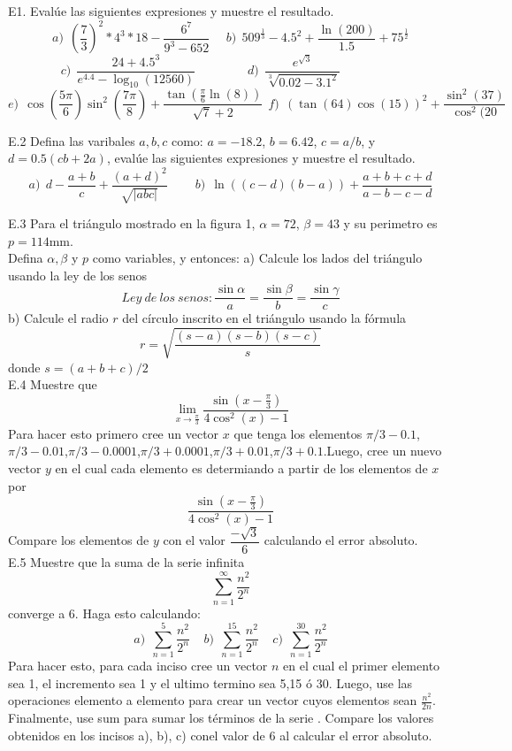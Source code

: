 \documentclass[12pt,letterpaper]{article}
\author{Andrés Limón Cruz }
\begin{document}
E1. Evalúe las siguientes expresiones y muestre el resultado.\\
$$
a)~~ \left( \frac{7}{3}\right) ^2 * 4^3 * 18 - \dfrac{6^7}{9^3-652}~~~~~~b)~~509^\frac{1}{3} -4.5^2+ \dfrac{\ln(200)}{1.5} +75^\frac{1}{2}
$$
$$
~~~~~~~c)~~\dfrac{24+4.5^3}{e^{4.4}-\log_{10}(12560)}~~~~~~~~~~~~~~~~~~~d)~~\dfrac{e^{\sqrt{3}}}{\sqrt[3]{0.02-3.1^2}}~~~~~~~~~~~~~~~~~~~~~~~~~~~~~
$$
$$
e)~~\cos \left( \frac{5 \pi}{6} \right) \sin^2 \left(\frac{7 \pi}{8} \right) + \dfrac{\tan \left( \frac{\pi}{6}\ln (8)\right)}{\sqrt{7} + 2}
~~f)~~\left( \tan(64) \cos(15) \right)^2 + \dfrac{\sin^2(37)}{\cos^2(20}
$$

E.2 Defina las varibales $a,b,c$ como: $a=-18.2$, $b=6.42$, $c=a/b$, y $d=0.5(cb+2a)$, evalúe las siguientes expresiones y muestre el resultado.
$$
a)~~d-\dfrac{a+b}{c}+\dfrac{(a+d)^2}{\sqrt{\vert abc \vert}}
~~~~~~~~~~b)~~\ln((c-d)(b-a))+ \dfrac{a+b+c+d}{a-b-c-d}
$$

E.3 Para el triángulo mostrado en la figura 1, $\alpha =72$, $\beta = 43$ y su perimetro es $p=114$mm.\\
Defina $\alpha , \beta$ y $p$ como variables, y entonces:
a) Calcule los lados del triángulo usando la ley de los senos
$$
Ley~de~los~senos: \dfrac{\sin \alpha}{a}= \dfrac{\sin \beta}{b}=\dfrac{\sin \gamma}{c}
$$
b) Calcule el radio $r$ del círculo inscrito en el triángulo usando la fórmula 
$$
r= \sqrt{\dfrac{(s-a)(s-b)(s-c)}{s}}
$$
donde $s = (a+b+c)/2$\\

E.4 Muestre que 
$$
\lim_{x \rightarrow \frac{\pi}{3}} \dfrac{\sin(x- \frac{\pi}{3})}{4 \cos^2(x)-1}
$$
Para hacer esto primero cree un vector $x$ que tenga los elementos $\pi / 3 -0.1$,$\pi / 3 - 0.01$,$\pi / 3 - 0.0001$,$\pi / 3 + 0.0001$,$\pi / 3 + 0.01$,$\pi / 3 + 0.1$.Luego, cree un nuevo vector $y$ en el cual cada elemento es determiando a partir de los elementos de $x$ por
$$
\dfrac{\sin(x- \frac{\pi}{3})}{4 \cos^2(x)-1}
$$
Compare los elementos de $y$ con el valor $\dfrac{- \sqrt{3}}{6}$ calculando el error absoluto.\\

E.5 Muestre que la suma de la serie infinita 
\[
\sum_{n=1}^{\infty} \dfrac{n^2}{2^n}
\]
converge a 6. Haga esto calculando:
\[
a)~~\sum_{n=1}^{5} \dfrac{n^2}{2^n}~~~~~b)~~\sum_{n=1}^{15} \dfrac{n^2}{2^n}~~~~~c)~~\sum_{n=1}^{30} \dfrac{n^2}{2^n}
\]
Para hacer esto, para cada inciso cree un vector $n$ en el cual el primer elemento sea 1, el incremento sea 1 y el ultimo termino sea 5,15 ó 30. Luego, use las operaciones elemento a elemento para crear un vector cuyos elementos sean $\frac{n^2}{2n}$. Finalmente, use sum para sumar los términos de la serie . Compare los valores obtenidos en los incisos a), b), c) conel valor de 6 al calcular el error absoluto.\\
\end{document}
